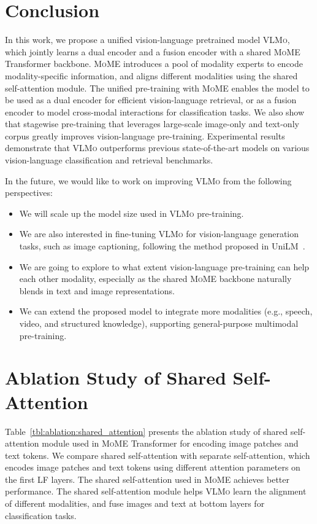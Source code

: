 \documentclass{article}
\newcommand\our{\textsc{VLMo}}
\newcommand\mome{\textsc{MoME}}
\begin{document}
\section{Conclusion}
In this work, we propose a unified vision-language pretrained model \our{}, which jointly learns a dual encoder and a fusion encoder with a shared \mome{} Transformer backbone. \mome{} introduces a pool of modality experts to encode modality-specific information, and aligns different modalities using the shared self-attention module. The unified pre-training with \mome{} enables the model to be used as a dual encoder for efficient vision-language retrieval, or as a fusion encoder to model cross-modal interactions for classification tasks. We also show that stagewise pre-training that leverages large-scale image-only and text-only corpus greatly improves vision-language pre-training. 
Experimental results demonstrate that \our{} outperforms previous state-of-the-art models on various vision-language classification and retrieval benchmarks. 

In the future, we would like to work on improving \our{} from the following perspectives:
\begin{itemize}
\item We will scale up the model size used in \our{} pre-training.
\item We are also interested in fine-tuning \our{} for vision-language generation tasks, such as image captioning, following the method proposed in UniLM~\citep{unilm}.
\item We are going to explore to what extent vision-language pre-training can help each other modality, especially as the shared \mome{} backbone naturally blends in text and image representations.
\item We can extend the proposed model to integrate more modalities (e.g., speech, video, and structured knowledge), supporting general-purpose multimodal pre-training.
\end{itemize}






\newpage
\appendix


\section{Ablation Study of Shared Self-Attention}
\label{app:shared_att}

Table~\ref{tbl:ablation:shared_attention} presents the ablation study of shared self-attention module used in \mome{} Transformer for encoding image patches and text tokens.
We compare shared self-attention with separate self-attention, which encodes image patches and text tokens using different attention parameters on the first LF layers.
The shared self-attention used in \mome{} achieves better performance.
The shared self-attention module helps \our{} learn the alignment of different modalities, and fuse images and text at bottom layers for classification tasks.
\end{document}
